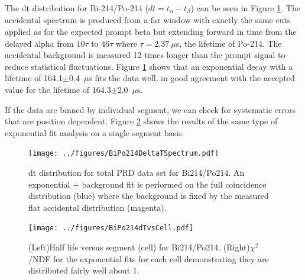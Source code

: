 The dt distribution for Bi-214/Po-214 ($dt=t_{\alpha}-t_{\beta}$) can be seen in Figure \ref{fig:Po214dtcum}. The accidental spectrum is produced from a far window with exactly the same cuts applied as for the expected prompt beta but extending forward in time from the delayed alpha from $10\tau$ to $46\tau$ where $\tau=2.37~\mu$s, the lifetime of Po-214. The accidental background is measured 12 times longer than the prompt signal to reduce statistical fluctuations. Figure \ref{fig:Po214dtcum} shows that an exponential decay with a lifetime of 164.1$\pm$0.4~$\mu$s fits the data well, in good agreement with the accepted value for the lifetime of 164.3$\pm$2.0~$\mu$s. 

If the data are binned by individual segment, we can check for systematic errors that are position dependent. Figure \ref{fig:Po214thalfvscell} shows the results of the same type of exponential fit analysis on a single segment basis.  
\begin{figure}[!h]
\centering
\texttt{[image: ../figures/BiPo214DeltaTSpectrum.pdf]}
\caption{\label{fig:Po214dtcum}dt distribution for total PRD data set for Bi214/Po214. An exponential + background fit is performed on the full coincidence distribution (blue) where the background is fixed by the measured flat accidental distribution (magenta). }
\end{figure}
\begin{figure}[!h]
	\centering
	\texttt{[image: ../figures/BiPo214dTvsCell.pdf]}
	\caption{\label{fig:Po214thalfvscell}(Left)Half life versus segment (cell) for Bi214/Po214. (Right)$\chi^2$/NDF for the exponential fits for each cell demonstrating they are distributed fairly well about 1.}
\end{figure}

